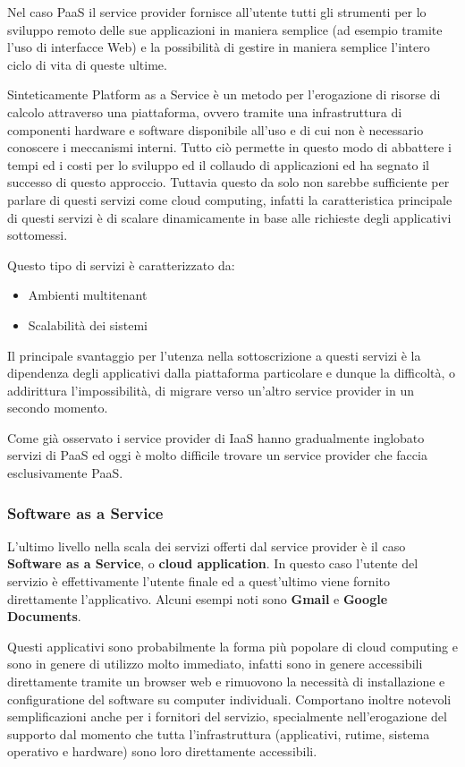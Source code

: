 \documentclass[italian,]{article}
\providecommand{\tightlist}{%
  \setlength{\itemsep}{0pt}\setlength{\parskip}{0pt}}
\begin{document}
Nel caso PaaS il service provider fornisce all'utente tutti gli
strumenti per lo sviluppo remoto delle sue applicazioni in maniera
semplice (ad esempio tramite l'uso di interfacce Web) e la possibilità
di gestire in maniera semplice l'intero ciclo di vita di queste ultime.

Sinteticamente Platform as a Service è un metodo per l'erogazione di
risorse di calcolo attraverso una piattaforma, ovvero tramite una
infrastruttura di componenti hardware e software disponibile all'uso e
di cui non è necessario conoscere i meccanismi interni. Tutto ciò
permette in questo modo di abbattere i tempi ed i costi per lo sviluppo
ed il collaudo di applicazioni ed ha segnato il successo di questo
approccio. Tuttavia questo da solo non sarebbe sufficiente per parlare
di questi servizi come cloud computing, infatti la caratteristica
principale di questi servizi è di scalare dinamicamente in base alle
richieste degli applicativi sottomessi.

Questo tipo di servizi è caratterizzato da:

\begin{itemize}
\tightlist
\item
  Ambienti multitenant
\item
  Scalabilità dei sistemi
\end{itemize}

Il principale svantaggio per l'utenza nella sottoscrizione a questi
servizi è la dipendenza degli applicativi dalla piattaforma particolare
e dunque la difficoltà, o addirittura l'impossibilità, di migrare verso
un'altro service provider in un secondo momento.

Come già osservato i service provider di IaaS hanno gradualmente
inglobato servizi di PaaS ed oggi è molto difficile trovare un service
provider che faccia esclusivamente PaaS.

\subsubsection{Software as a Service}\label{software-as-a-service}

L'ultimo livello nella scala dei servizi offerti dal service provider è
il caso \textbf{Software as a Service}, o \textbf{cloud application}. In
questo caso l'utente del servizio è effettivamente l'utente finale ed a
quest'ultimo viene fornito direttamente l'applicativo. Alcuni esempi
noti sono \textbf{Gmail} e \textbf{Google Documents}.

Questi applicativi sono probabilmente la forma più popolare di cloud
computing e sono in genere di utilizzo molto immediato, infatti sono in
genere accessibili direttamente tramite un browser web e rimuovono la
necessità di installazione e configuratione del software su computer
individuali. Comportano inoltre notevoli semplificazioni anche per i
fornitori del servizio, specialmente nell'erogazione del supporto dal
momento che tutta l'infrastruttura (applicativi, rutime, sistema
operativo e hardware) sono loro direttamente accessibili.
\end{document}
